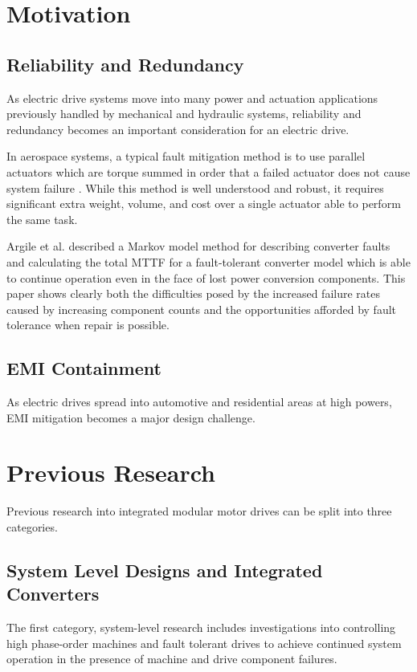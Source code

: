 \section{Motivation}

\subsection{Reliability and Redundancy}
As electric drive systems move into many power and actuation applications
previously handled by mechanical and hydraulic systems, reliability and
redundancy becomes an important consideration for an electric drive.

In aerospace systems, a typical fault mitigation method is to use parallel
actuators which are torque summed in order that a failed actuator does not
cause system failure \cite{Annaz09}.
While this method is well understood and robust, it requires significant extra
weight, volume, and cost over a single actuator able to perform the same task.

Argile et al. \cite{Argile08} described a Markov model method for describing
converter faults and calculating the total MTTF for a fault-tolerant converter
model which is able to continue operation even in the face of lost power
conversion components.
This paper shows clearly both the difficulties posed by the increased failure
rates caused by increasing component counts and the opportunities afforded by
fault tolerance when repair is possible.


\subsection{EMI Containment}
As electric drives spread into automotive and residential areas at high
powers, EMI mitigation becomes a major design challenge.



\section{Previous Research}
Previous research into integrated modular motor drives can be split into three
categories.
\subsection{System Level Designs and Integrated Converters}
The first category, system-level research includes investigations into
controlling high phase-order machines and fault tolerant drives to achieve
continued system operation in the presence of machine and drive component
failures.

